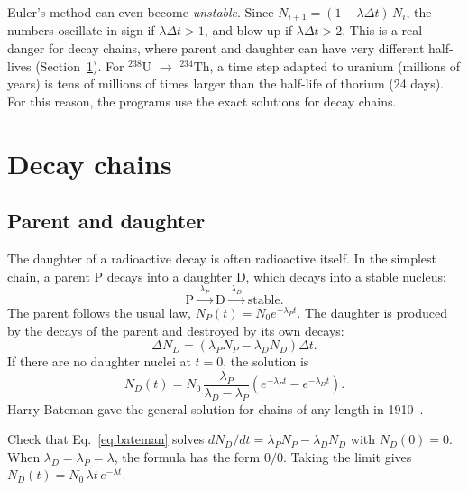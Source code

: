 \documentclass[11pt,a4paper]{article}
\newcommand{\iso}[2]{\ensuremath{{}^{#1}\mathrm{#2}}}         %
\begin{document}
\begin{furtherbox}
Euler's method can even become \emph{unstable}. Since $N_{i+1} = (1 - \lambda \Delta t)\,N_i$, the numbers oscillate in sign if $\lambda \Delta t > 1$, and blow up if $\lambda \Delta t > 2$. This is a real danger for decay chains, where parent and daughter can have very different half-lives (Section~\ref{sec:chains}). For \iso{238}{U} $\to$ \iso{234}{Th}, a time step adapted to uranium (millions of years) is tens of millions of times larger than the half-life of thorium (24 days). For this reason, the programs use the exact solutions for decay chains.
\end{furtherbox}

\section{Decay chains}
\label{sec:chains}

\subsection{Parent and daughter}

The daughter of a radioactive decay is often radioactive itself. In the simplest chain, a parent P decays into a daughter D, which decays into a stable nucleus:
\[
\text{P} \xrightarrow{\;\lambda_P\;} \text{D} \xrightarrow{\;\lambda_D\;} \text{stable}.
\]
The parent follows the usual law, $N_P(t) = N_0 e^{-\lambda_P t}$. The daughter is produced by the decays of the parent and destroyed by its own decays:
\begin{equation}
  \Delta N_D = \left( \lambda_P N_P - \lambda_D N_D \right) \Delta t .
  \label{eq:chain}
\end{equation}
If there are no daughter nuclei at $t = 0$, the solution is
\begin{equation}
  N_D(t) = N_0\, \frac{\lambda_P}{\lambda_D - \lambda_P} \left( e^{-\lambda_P t} - e^{-\lambda_D t} \right).
  \label{eq:bateman}
\end{equation}
Harry Bateman gave the general solution for chains of any length in 1910~\cite{Bateman1910}.

\begin{furtherbox}
Check that Eq.~\eqref{eq:bateman} solves $dN_D/dt = \lambda_P N_P - \lambda_D N_D$ with $N_D(0) = 0$. When $\lambda_D = \lambda_P = \lambda$, the formula has the form $0/0$. Taking the limit gives $N_D(t) = N_0\, \lambda t\, e^{-\lambda t}$.
\end{furtherbox}
\end{document}
